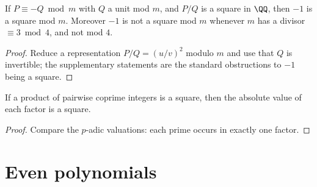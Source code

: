 \begin{lemma}
  \label{lem:zmodsquare}
  \leanok
  If $P \equiv -Q \bmod m$ with $Q$ a unit mod $m$, and $P/Q$ is a square in $\QQ$, then $-1$ is
  a square mod $m$. Moreover $-1$ is not a square mod $m$ whenever $m$ has a divisor
  $\equiv 3 \bmod 4$, and not mod $4$.
\end{lemma}
\begin{proof}
  \leanok
  Reduce a representation $P/Q = (u/v)^2$ modulo $m$ and use that $Q$ is invertible; the
  supplementary statements are the standard obstructions to $-1$ being a square.
\end{proof}

\begin{lemma}
  \label{lem:coprimesquare}
  \leanok
  If a product of pairwise coprime integers is a square, then the absolute value of each factor
  is a square.
\end{lemma}
\begin{proof}
  \leanok
  Compare the $p$-adic valuations: each prime occurs in exactly one factor.
\end{proof}

\section{Even polynomials}

